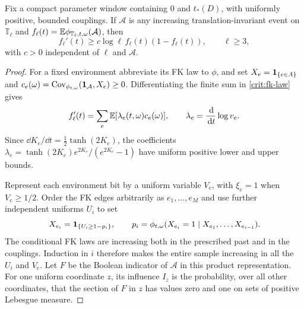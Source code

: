 \begin{lemma}\label{crit:threshold}
Fix a compact parameter window containing $0$ and $t_*(D)$, with
uniformly positive, bounded couplings.  If $\mathcal A$ is any
increasing translation-invariant event on $\mathbb T_\ell$ and
$f_\ell(t)=\mathbb E\phi_{\mathbb T_\ell,t,\omega}(\mathcal A)$, then
\begin{equation}\label{crit:threshold-inequality}
 f_\ell'(t)\ge c\log\ell\, f_\ell(t)(1-f_\ell(t)),
 \qquad \ell\ge3,
\end{equation}
with $c>0$ independent of $\ell$ and $\mathcal A$.
\end{lemma}

\begin{proof}
For a fixed environment abbreviate its FK law to $\phi$, and set
$X_e=\mathbf 1_{\{e\in A\}}$ and
$c_e(\omega)=\operatorname{Cov}_{\phi_{t,\omega}}(\mathbf 1_{\mathcal A},X_e)\ge0$.
Differentiating the finite sum in \eqref{crit:fk-law} gives
\begin{equation}\label{crit:derivative}
 f_\ell'(t)=\sum_e\mathbb E[\lambda_e(t,\omega)c_e(\omega)],
 \qquad
 \lambda_e=\frac{\,\mathrm d}{\,\mathrm d t}\log v_e.
\end{equation}
Since $\dd K_e/\dd t=\tfrac12\tanh(2K_e)$, the coefficients
$\lambda_e=\tanh(2K_e)e^{2K_e}/(e^{2K_e}-1)$ have uniform positive
lower and upper bounds.

Represent each environment bit by a uniform variable $V_e$, with
$\xi_e=1$ when $V_e\ge1/2$.  Order the FK edges arbitrarily as
$e_1,\ldots,e_M$ and use further independent uniforms $U_i$ to set
\[
 X_{e_i}=\mathbf 1_{\{U_i\ge1-p_i\}},\qquad
 p_i=\phi_{t,\omega}(X_{e_i}=1\mid X_{e_1},\ldots,X_{e_{i-1}}).
\]
The conditional FK laws are increasing both in the prescribed past
and in the couplings.  Induction in $i$ therefore makes the entire
sample increasing in all the $U_i$ and $V_e$.  Let $F$ be the Boolean
indicator of $\mathcal A$ in this product representation.  For one
uniform coordinate $z$, its influence $I_z$ is the probability, over
all other coordinates, that the section of $F$ in $z$ has values zero
and one on sets of positive Lebesgue measure.


\end{proof}
